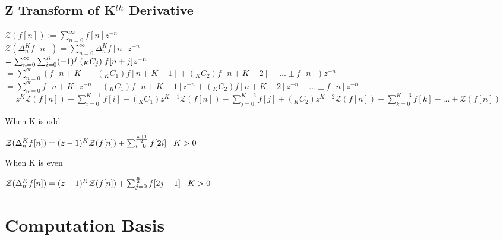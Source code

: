 \documentclass[11pt]{article}
\begin{document}
\subsection{Z Transform of K$^{th}$ Derivative}
\vspace{1mm}
\begin{center}
$
\mathcal{Z}(f[n]) := \sum_{n=0}^{\infty}f[n]z^{-n}
$
\\ \vspace{5mm}
$
\mathcal{Z}(\Delta_n^K f[n]) = \sum_{n=0}^{\infty} \Delta_n^K f[n]z^{-n}
$
\\ \vspace{5mm}
$
= \sum_{n=0}^{\infty} \sum_{i=0}^K (-1)^{j} \hspace{1mm} (_K C _j) \hspace{1mm} f[n + j] z^{-n}
$
\\ \vspace{5mm}
$
= \sum_{n=0}^{\infty} (f[n+K] - (_K C _1) f[n+K-1] +  (_K C _2) f[n+K-2] - ...\pm f[n])z^{-n}
$
\\ \vspace{5mm}
$
= \sum_{n=0}^{\infty} f[n+K]z^{-n} - (_K C _1) f[n+K-1]z^{-n} +  (_K C _2) f[n+K-2]z^{-n} - ...\pm f[n]z^{-n}
$
\\ \vspace{5mm}
$
= z^K \mathcal{Z}(f[n]) +\sum_{i=0}^{K-1} f[i] - (_K C _1)z^{K-1} \mathcal{Z}(f[n]) - \sum_{j=0}^{K-2}f[j] + (_K C _2)z^{K-2} \mathcal{Z}(f[n])+\sum_{k=0}^{K-3}f[k] - ... \pm \mathcal{Z}(f[n])
$
\end{center}
When K is odd
\begin{center}
$
\mathcal{Z}(\Delta_n^K f[n]) = (z-1)^K \mathcal{Z}(f[n]) + \sum_{i=0}^{\frac{n+1}{2}} f[2i] \hspace{3mm} K > 0
$
\end{center}
When K is even
\begin{center}
$
\mathcal{Z}(\Delta_n^K f[n]) = (z-1)^K \mathcal{Z}(f[n]) + \sum_{j=0}^{\frac{n}{2}} f[2j + 1] \hspace{3mm} K > 0
$
\end{center}














\newpage

\section*{Computation Basis}
\end{document}
